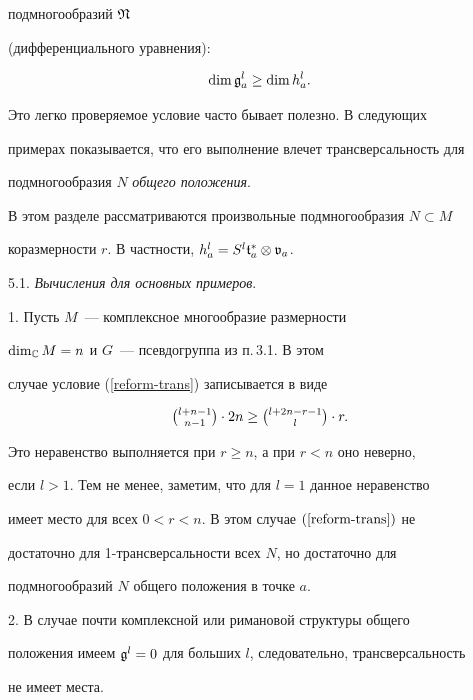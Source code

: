 подмногообразий $\frak{N}$


(дифференциального уравнения):


\begin{equation}


\dim\g^l_a\ge\dim h_a^l. \label{reform-trans}


\end{equation}


Это легко проверяемое условие часто бывает полезно. В следующих


примерах показывается, что его выполнение влечет трансверсальность для


подмногообразия $N$ {\em общего положения}.





В этом разделе рассматриваются произвольные подмногообразия $N\subset M$


коразмерности $r$. В частности, $h_a^l=S^l{\frak t}^*_a\otimes{\frak v}_a$.


\medskip





5.1. {\it Вычисления для основных примеров}.


1. Пусть $M$~--- комплексное многообразие размерности


$\dim_{\Bbb C} M=n$ и $G$~--- псевдогруппа из п.\,3.1. В этом


случае условие (\ref{reform-trans}) записывается в виде


$$


\tbinom{l+n-1}{n-1}\cdot2n\ge\tbinom{l+2n-r-1}l\cdot r.


$$


Это неравенство выполняется при $r\ge n$, а при $r<n$ оно неверно,


если $l>1$. Тем не менее, заметим, что для $l=1$ данное неравенство


имеет место для всех $0<r<n$. В этом случае $(\ref{reform-trans})$ не


достаточно для 1-трансверсальности всех $N$, но достаточно для


подмногообразий $N$ общего положения в точке $a$.





2. В случае почти комплексной или римановой структуры общего


положения имеем ${\frak g}^l=0$ для больших $l$, следовательно, трансверсальность


не имеет места.





